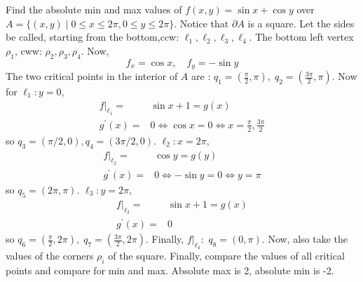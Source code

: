 \documentclass[12pt]{book}
\theoremstyle{definition}
\theoremstyle{remark}
\begin{document}
  \begin{example} Find the absolute min and max values of $f(x,y) = \sin x + \cos y$ over $A = \{ (x,y)\mid 0 \leq x \leq 2 \pi , 0\leq y \leq 2 \pi \}$. Notice that $\partial A$ is a square. Let the sides be called, starting from the bottom,ccw: $\ell_1, \ell_2 , \ell_3 ,\ell_4$. The bottom left vertex $\rho_1$, cww: $\rho_2 , \rho_3 , \rho_4$. Now, 
    $$f_x = \cos x , \quad f_y = -\sin y $$
    The two critical points in the interior of $A$ are : $q_1=(\frac{\pi }{2}, \pi ), \; q_2=(\frac{3\pi}{2} , \pi)$.
    Now for $\ell_1 : y = 0$, 
    \begin{equation*}
      \begin{split}
        f|_{\ell_1}=& \sin x + 1 = g(x) \\ 
        g^\prime (x) =& 0 \iff \cos x = 0 \iff x = \frac{\pi }{2},\frac{3 \pi}{2} 
      \end{split}
    \end{equation*}
    so $q_3 = (\pi / 2, 0), q_4= (3 \pi /2 , 0)$. $\ell_2: x = 2 \pi$, 
     \begin{equation*}
      \begin{split}
        f|_{\ell_2}=& \cos y = g(y) \\ 
        g^\prime (x) =& 0 \iff -\sin y = 0 \iff y = \pi 
      \end{split}
     \end{equation*}
     so $q_5 = (2 \pi , \pi)$. $\ell_3 : y = 2 \pi,$
     \begin{equation*}
      \begin{split}
        f|_{\ell_3}=& \sin x + 1 = g(x) \\ 
        g^\prime (x) =& 0 
      \end{split}
     \end{equation*}
     so $q_6 = (\frac{\pi}{2}, 2 \pi ), \; q_7 = (\frac{3 \pi}{2} , 2 \pi)$. Finally, $f|_{\ell_4}: $ $q_8 = (0,\pi).$
     \newline
     Now, also take the values of the corners $\rho_i$ of the square. Finally, compare the values of all critical points and compare for min and max. Absolute max is 2, absolute min is -2. 
    \end{example}
\end{document}
